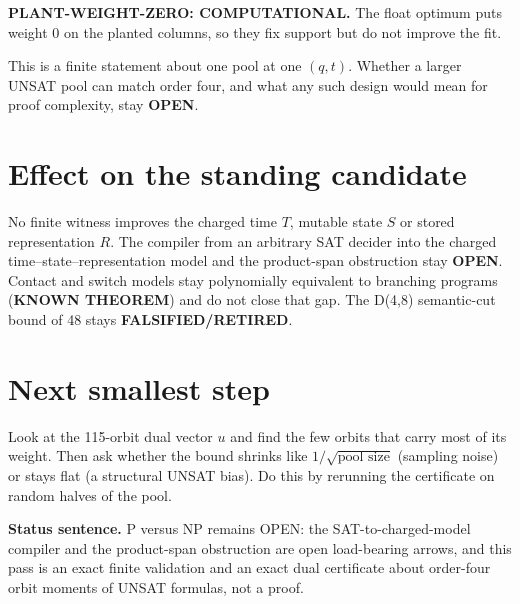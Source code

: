 \documentclass[11pt]{article}
\begin{document}
\textbf{PLANT-WEIGHT-ZERO: COMPUTATIONAL.} The float optimum puts weight 0 on the planted columns, so they fix support but do not improve the fit.

This is a finite statement about one pool at one $(q,t)$. Whether a larger UNSAT pool can match order four, and what any such design would mean for proof complexity, stay \textbf{OPEN}.

\section*{Effect on the standing candidate}
No finite witness improves the charged time $T$, mutable state $S$ or stored representation $R$. The compiler from an arbitrary SAT decider into the charged time--state--representation model and the product-span obstruction stay \textbf{OPEN}. Contact and switch models stay polynomially equivalent to branching programs (\textbf{KNOWN THEOREM}) and do not close that gap. The D(4,8) semantic-cut bound of 48 stays \textbf{FALSIFIED/RETIRED}.

\section*{Next smallest step}
Look at the 115-orbit dual vector $u$ and find the few orbits that carry most of its weight. Then ask whether the bound shrinks like $1/\sqrt{\text{pool size}}$ (sampling noise) or stays flat (a structural UNSAT bias). Do this by rerunning the certificate on random halves of the pool.

\bigskip
\noindent\textbf{Status sentence.} P versus NP remains OPEN: the SAT-to-charged-model compiler and the product-span obstruction are open load-bearing arrows, and this pass is an exact finite validation and an exact dual certificate about order-four orbit moments of UNSAT formulas, not a proof.
\end{document}

